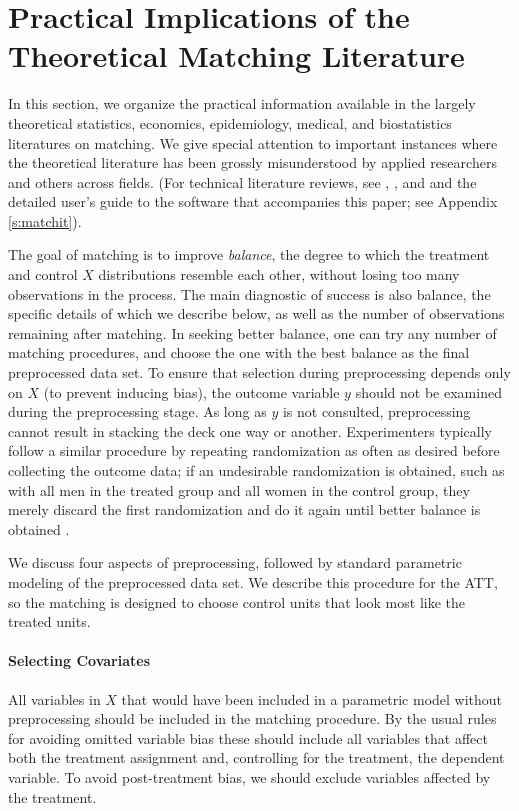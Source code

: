 \documentclass[11pt,titlepage]{article}
\begin{document}
\section{Practical Implications of the Theoretical Matching
  Literature}
\label{s:choose}

In this section, we organize the practical information available in
the largely theoretical statistics, economics, epidemiology, medical,
and biostatistics literatures on matching.  We give special attention
to important instances where the theoretical literature has been
grossly misunderstood by applied researchers and others across fields.
(For technical literature reviews, see \citet{Imbens04},
\citet{Rosenbaum02}, and \citet{Stuart04} and the detailed user's
guide to the software that accompanies this paper; see Appendix
\ref{s:matchit}).

The goal of matching is to improve \emph{balance}, the degree to which
the treatment and control $X$ distributions resemble each other,
without losing too many observations in the process.  The main
diagnostic of success is also balance, the specific details of which
we describe below, as well as the number of observations remaining
after matching.  In seeking better balance, one can try any number of
matching procedures, and choose the one with the best balance as the
final preprocessed data set.  To ensure that selection during
preprocessing depends only on $X$ (to prevent inducing bias), the
outcome variable $y$ should not be examined during the preprocessing
stage.  As long as $y$ is not consulted, preprocessing cannot result
in stacking the deck one way or another.  Experimenters typically
follow a similar procedure by repeating randomization as often as
desired before collecting the outcome data; if an undesirable
randomization is obtained, such as with all men in the treated group
and all women in the control group, they merely discard the first
randomization and do it again until better balance is obtained
\citep[see][]{Rubin01}.

We discuss four aspects of preprocessing, followed by standard
parametric modeling of the preprocessed data set.  We describe this
procedure for the ATT, so the matching is designed to choose control
units that look most like the treated units.

\paragraph{Selecting Covariates}
All variables in $X$ that would have been included in a parametric
model without preprocessing should be included in the matching
procedure.  By the usual rules for avoiding omitted variable bias
these should include all variables that affect both the treatment
assignment and, controlling for the treatment, the dependent variable.
To avoid post-treatment bias, we should exclude variables affected by
the treatment.  
\end{document}
